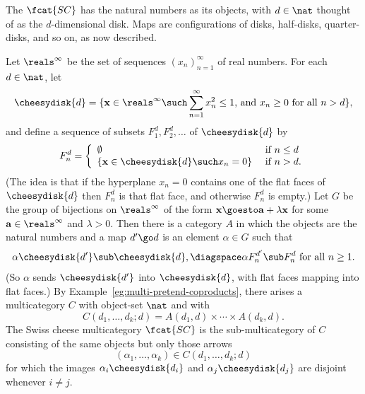 \begin{example}	
The  $\fcat{SC}$ has the natural numbers
as its objects, with $d\in\nat$ thought of as the $d$-dimensional disk.
Maps are configurations of disks, half-disks, quarter-disks, and so on, as
now described.

Let $\reals^\infty$ be the set of sequences $(x_n)_{n=1}^{\infty}$ of real
numbers.  For each $d\in\nat$, let
\[
\cheesydisk{d} = 
\{ \mathbf{x} \in \reals^\infty
\such
\sum_{n=1}^{\infty} x_n^2 \leq 1 
\textrm{, and } x_n \geq 0 \textrm{ for all } n>d \},
\]
and define a sequence of subsets $F^d_1, F^d_2, \ldots$ of $\cheesydisk{d}$
by
\[
F^d_n =
\left\{
\begin{array}{ll}
\emptyset	&\textrm{ if } n\leq d	\\
\{ \mathbf{x} \in \cheesydisk{d}
\such
x_n = 0 \}	&\textrm{ if } n>d.
\end{array}
\right.
\]
(The idea is that if the hyperplane $x_n = 0$ contains one of the flat
faces of $\cheesydisk{d}$ then $F^d_n$ is that flat face, and otherwise
$F^d_n$ is empty.)  Let $G$ be the group of bijections on $\reals^\infty$
of the form $\mathbf{x} \goesto \mathbf{a} + \lambda\mathbf{x}$ for some
$\mathbf{a} \in \reals^\infty$ and $\lambda > 0$.  Then there is a category
$A$ in which the objects are the natural numbers and a map $d' \go d$ is an
element $\alpha\in G$ such that
\[
\alpha\cheesydisk{d'} \sub \cheesydisk{d},
\diagspace
\alpha F^{d'}_n \sub F^d_n \textrm{ for all } n\geq 1.
\]
(So $\alpha$ sends $\cheesydisk{d'}$ into $\cheesydisk{d}$, with flat faces
mapping into flat faces.)  By Example~\ref{eg:multi-pretend-coproducts},
there arises a multicategory $C$ with object-set $\nat$ and with
\[
C(d_1, \ldots, d_k; d) = A(d_1, d) \times\cdots\times A(d_k, d).
\]
The Swiss cheese multicategory $\fcat{SC}$ is the sub-multicategory of $C$
consisting of the same objects but only those arrows
\[
(\alpha_1, \ldots, \alpha_k) \in C(d_1, \ldots, d_k; d)
\]
for which the images $\alpha_i \cheesydisk{d_i}$ and $\alpha_j
\cheesydisk{d_j}$ are disjoint whenever $i\neq j$.  


\end{example}

